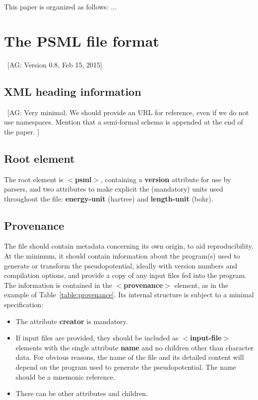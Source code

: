\documentclass[prb,showpacs,superscriptaddress]{revtex4-1}
\def\tag#1{\textbf{$<$#1$>$}}
\def\att#1{\textbf{#1}}
\newcommand{\AG}[1]{{\color{red}~\textsf{[AG: #1]}}}
\begin{document}
This paper is organized as follows: ...


\section{The PSML file format}
\AG{Version 0.8, Feb 15, 2015}
\label{sec:structure}

\subsection{XML heading information}

\AG{Very minimal. We should provide an URL for reference, even if we do
 not use namespaces. Mention that a semi-formal schema is appended at
 the end of the paper.
}
\subsection{Root element}
The root element is \tag{psml}, containing a \att{version} attribute
for use by parsers, and two attributes to make explicit the
(mandatory) units used throughout the file: \att{energy-unit}
(hartree) and \att{length-unit} (bohr).

\subsection{Provenance}

The file should contain metadata concerning its own origin, to
aid reproducibility. At the minimum, it should contain information
about the program(s) used to generate or transform the
pseudopotential, ideally with version numbers and compilation options,
and provide a copy of any input files fed into the program. The
information is contained in the \tag{provenance} element, as in the
example of Table~\ref{table:provenance}. Its internal
structure is subject to a minimal specification:
\begin{itemize}
\item The attribute \att{creator} is mandatory.
\item If input files are provided, they should be included as
\tag{input-file} elements with the single attribute \att{name}
 and no children other than character data.
For obvious reasons, the name of the file and its detailed content
will depend on the program used to generate the pseudopotential. The
name should be a mnemonic reference.
\item There can be other attributes and children.
\end{itemize}
\end{document}
